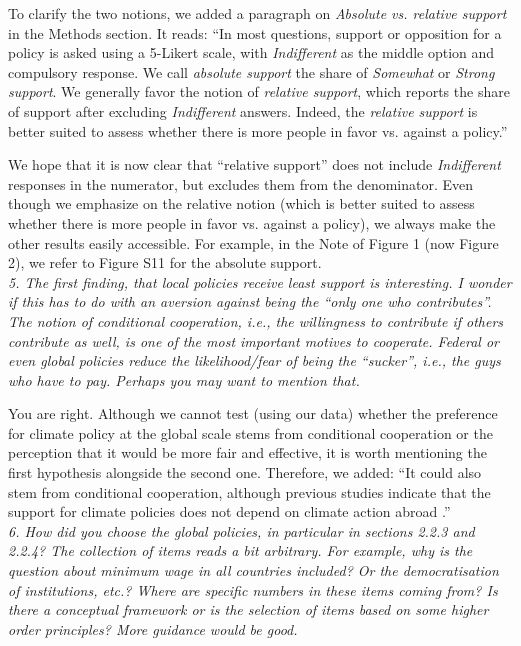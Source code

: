 \documentclass[12pt,english]{article}
\begin{document}
To clarify the two notions, we added a paragraph on \textit{Absolute vs. relative support} in the Methods section. It reads: ``In most questions, support or opposition for a policy is asked using a 5-Likert scale, with \textit{Indifferent} as the middle option and compulsory response. We call \textit{absolute support} the share of \textit{Somewhat} or \textit{Strong support}. We generally favor the notion of \textit{relative support}, which reports the share of support after excluding \textit{Indifferent} answers. Indeed, the \textit{relative support} is better suited to assess whether there is more people in favor vs. against a policy.''

We hope that it is now clear that ``relative support'' does not include \textit{Indifferent} responses in the numerator, but excludes them from the denominator. Even though we emphasize on the relative notion (which is better suited to assess whether there is more people in favor vs. against a policy), we always make the other results easily accessible. For example, in the Note of Figure 1 (now Figure 2), we refer to Figure S11 for the absolute support.
~\\

\textit{5. The first finding, that local policies receive least support is interesting. I wonder if this has to do with an aversion against being the “only one who contributes”. The notion of conditional cooperation, i.e., the willingness to contribute if others contribute as well, is one of the most important motives to cooperate. Federal or even global policies reduce the likelihood/fear of being the “sucker”, i.e., the guys who have to pay. Perhaps you may want to mention that.}

You are right. Although we cannot test (using our data) whether the preference for climate policy at the global scale stems from conditional cooperation or the perception that it would be more fair and effective, it is worth mentioning the first hypothesis alongside the second one. Therefore, we added: ``It could also stem from conditional cooperation, although previous studies indicate that the support for climate policies does not depend on climate action abroad \citep{aklin_prisoners_2020,tingley_conditional_2014}.''
~\\

\textit{6. How did you choose the global policies, in particular in sections 2.2.3 and 2.2.4? The collection of items reads a bit arbitrary. For example, why is the question about minimum wage in all countries included? Or the democratisation of institutions, etc.? Where are specific numbers in these items coming from? Is there a conceptual framework or is the selection of items based on some higher order principles? More guidance would be good.}
\end{document}
